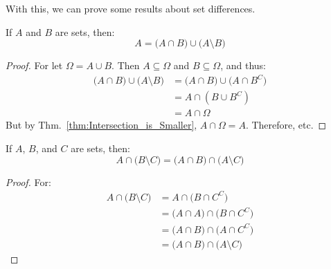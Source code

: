         With this, we can prove some results about
        set differences.
        \begin{theorem}
            If $A$ and $B$ are sets, then:
            \begin{equation}
                A=\big(A\cap{B}\big)
                    \cup\big(A\setminus{B}\big)
            \end{equation}
        \end{theorem}
        \begin{proof}
            For let $\Omega=A\cup{B}$. Then
            $A\subseteq\Omega$ and $B\subseteq\Omega$,
            and thus:
            \begin{subequations}
                \begin{align}
                    \big(A\cap{B})\cup\big(A\setminus{B}\big)
                    &=\big(A\cap{B}\big)
                        \cup\big(A\cap{B}^{C}\big)\\
                    &=A\cap(B\cup{B}^{C})\\
                    &=A\cap\Omega
                \end{align}
            \end{subequations}
            But by Thm.~\ref{thm:Intersection_is_Smaller},
            $A\cap\Omega=A$. Therefore, etc.
        \end{proof}
        \begin{theorem}
            If $A$, $B$, and $C$ are sets, then:
            \begin{equation}
                A\cap\big(B\setminus{C}\big)
                =\big(A\cap{B}\big)\cap\big(A\setminus{C}\big)
            \end{equation}
        \end{theorem}
        \begin{proof}
            For:
            \begin{subequations}
                \begin{align}
                    A\cap\big(B\setminus{C}\big)
                    &=A\cap\big(B\cap{C}^{C}\big)\\
                    &=\big(A\cap{A}\big)
                        \cap\big(B\cap{C}^{C}\big)\\
                    &=\big(A\cap{B}\big)
                        \cap\big(A\cap{C}^{C}\big)\\
                    &=\big(A\cap{B}\big)
                        \cap\big(A\setminus{C}\big)
                \end{align}
            \end{subequations}
        \end{proof}
